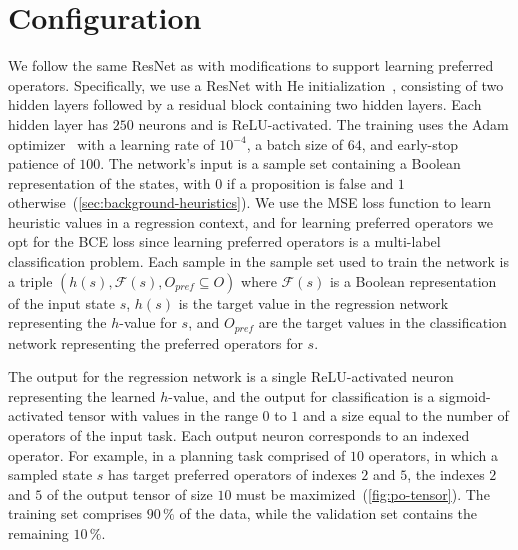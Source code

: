 \documentclass[ppgc,diss,english]{iiufrgs}
\begin{document}
\section{Configuration}
\label{sec:exp-configuration}
We follow the same ResNet as \citet{Bettker.etal/2022} with modifications to support learning preferred operators. Specifically, we use a ResNet with He initialization~\cite{He.etal/2015}, consisting of two hidden layers followed by a residual block containing two hidden layers.
Each hidden layer has $250$ neurons and is ReLU-activated.
The training uses the Adam optimizer~\cite{Kingma.Ba/2015} with a learning rate of $10^{-4}$, a batch size of $64$, and early-stop patience of $100$.
The network's input is a sample set containing a Boolean representation of the states, with $0$ if a proposition is false and $1$ otherwise~(\cref{sec:background-heuristics}).
We use the MSE loss function to learn heuristic values in a regression context, and for learning preferred operators we opt for the BCE loss since learning preferred operators is a multi-label classification problem.
Each sample in the sample set used to train the network is a triple $(h(s), \mathcal{F}(s), O_{pref} \subseteq O)$
where $\mathcal{F}(s)$ is a Boolean representation of the input state $s$, $h(s)$ is the target value in the regression network representing the $h$-value for $s$, and $O_{pref}$ are the target values in the classification network representing the preferred operators for $s$.

The output for the regression network is a single ReLU-activated neuron representing the learned $h$-value, and the output for classification is a sigmoid-activated tensor with values in the range $0$ to $1$ and a size equal to the number of operators of the input task.
Each output neuron corresponds to an indexed operator. For example, in a planning task comprised of $10$ operators, in which a sampled state $s$ has target preferred operators of indexes $2$ and $5$, the indexes $2$ and $5$ of the output tensor of size $10$ must be maximized~(\cref{fig:po-tensor}). The training set comprises $90\,\%$ of the data, while the validation set contains the remaining $10\,\%$.
\end{document}
